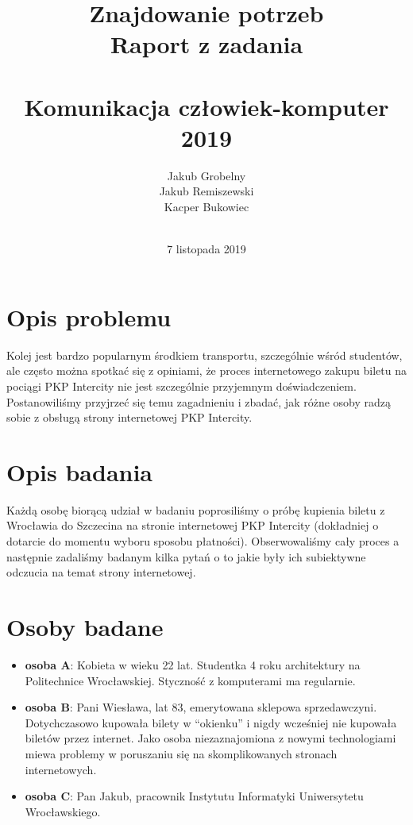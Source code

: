\documentclass[12pt, a4paper, oneside]{report}
\title{\Huge \textbf{Znajdowanie potrzeb}\\
       \large \textbf{Raport z zadania}\\\,\\
       \Large Komunikacja człowiek-komputer 2019}
\date{\,\\7 listopada 2019}
\author{Jakub Grobelny\\ Jakub Remiszewski\\ Kacper Bukowiec}
\begin{document}
\begin{titlepage}
    \maketitle
    \thispagestyle{empty}
\end{titlepage}

\renewcommand*\thesubsection{\arabic{section}}

\section*{Opis problemu}

Kolej jest bardzo popularnym środkiem transportu, szczególnie wśród studentów,
ale często można spotkać się z opiniami, że proces internetowego zakupu biletu 
na pociągi PKP Intercity nie jest szczególnie przyjemnym doświadczeniem. 
Postanowiliśmy przyjrzeć się temu zagadnieniu i zbadać, jak różne osoby radzą 
sobie z obsługą strony internetowej PKP Intercity.

\section*{Opis badania}

Każdą osobę biorącą udział w badaniu poprosiliśmy o
próbę kupienia biletu z Wrocławia do Szczecina na stronie internetowej
PKP Intercity (dokładniej o dotarcie do momentu wyboru sposobu
płatności). Obserwowaliśmy cały proces a następnie zadaliśmy
badanym kilka pytań o to jakie były ich subiektywne odczucia na temat
strony internetowej.

\section*{Osoby badane}

\begin{itemize}
    \item \textbf{osoba A}: Kobieta w wieku 22 lat. Studentka 4 roku 
    architektury na Politechnice Wrocławskiej. Styczność z komputerami ma 
    regularnie.
    \item \textbf{osoba B}: Pani Wiesława, lat 83, emerytowana sklepowa 
    sprzedawczyni.
    Dotychczasowo kupowała bilety w “okienku” i nigdy wcześniej nie kupowała
    biletów przez internet. Jako osoba niezaznajomiona z nowymi technologiami
    miewa problemy w poruszaniu się na skomplikowanych stronach internetowych. 
    \item \textbf{osoba C}: Pan Jakub, pracownik Instytutu Informatyki 
    Uniwersytetu Wrocławskiego.
\end{itemize}
\end{document}
